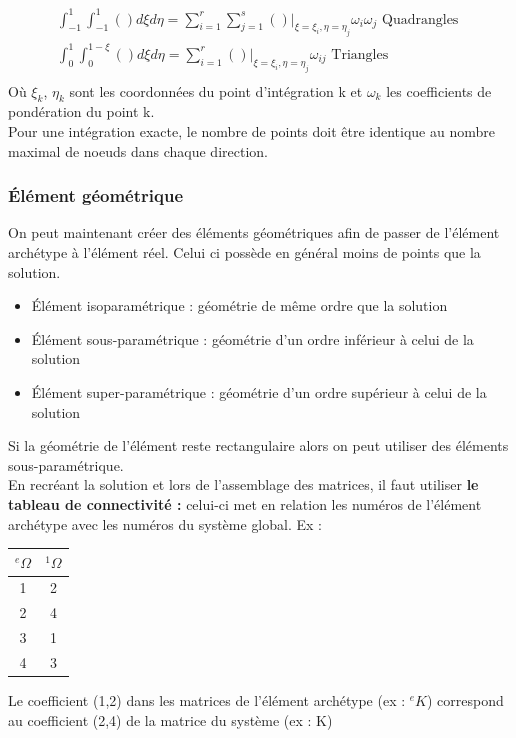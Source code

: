 \documentclass[../main.tex]{subfiles}
\begin{document}
\begin{equation}
    \begin{gathered}
        \int_{-1}^1 \int_{-1}^1 () d\xi d\eta = \sum_{i=1}^r \sum_{j=1}^s ()\lvert_{\xi = \xi_i, \eta = \eta_j} \omega_i \omega_j \text{ Quadrangles }\\
        \int_{0}^1 \int_0^{1-\xi}() d\xi d\eta = \sum_{i=1}^r ()\lvert_{\xi = \xi_i, \eta = \eta_j} \omega_{ij} \text{ Triangles }\\
    \end{gathered}
\end{equation}
Où $\xi_k$, $\eta_k$ sont les coordonnées du point d'intégration k et $\omega_k$ les coefficients de pondération du point k.\\

\warning Pour une intégration exacte, le nombre de points doit être identique au nombre maximal de noeuds dans chaque direction.\\

\subsubsection{Élément géométrique}
On peut maintenant créer des éléments géométriques afin de passer de l'élément archétype à l'élément réel. Celui ci possède en général moins de points que la solution.\\
\begin{itemize}
    \item Élément isoparamétrique : géométrie de même ordre que la solution\\
    \item Élément sous-paramétrique : géométrie d'un ordre inférieur à celui de la solution\\
    \item Élément super-paramétrique : géométrie d'un ordre supérieur à celui de la solution\\
\end{itemize}

Si la géométrie de l'élément reste rectangulaire alors on peut utiliser des éléments sous-paramétrique.\\

\warning En recréant la solution et lors de l'assemblage des matrices, il faut utiliser \textbf{le tableau de connectivité :} celui-ci met en relation les numéros de l'élément archétype avec les numéros du système global. Ex : \begin{table}[hbt!]
    \centering
    \begin{tabular}{c|c}
        ${}^e\Omega$ & ${}^1\Omega$ \\ \hline
        1 & 2\\
        2 & 4\\
        3 & 1\\
        4 & 3\\
    \end{tabular}
\end{table}
Le coefficient (1,2) dans les matrices de l'élément archétype (ex : ${}^eK$) correspond au coefficient (2,4) de la matrice du système (ex : K)\\
\end{document}
